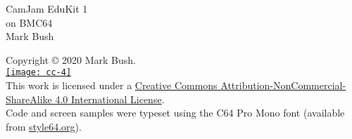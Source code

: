 \begin{titlepage}
\sffamily\bfseries
\vspace*{20ex}
\begin{flushright}\Huge
CamJam EduKit 1\\
on BMC64\\[2ex]\Large
Mark Bush
\end{flushright}
\end{titlepage}

\begin{titlepage}
\setlength{\parindent}{0pt}

\vspace*{\fill}

Copyright \copyright{} 2020 Mark Bush.\\[2ex]
\href{http://creativecommons.org/licenses/by-nc-sa/4.0/}{\texttt{[image: cc-4]}}\\
This work is licensed under a \href{http://creativecommons.org/licenses/by-nc-sa/4.0/}{Creative Commons Attribution-NonCommercial-ShareAlike 4.0 International License}.\\[2ex]

Code and screen samples were typeset using the C64 Pro Mono font (available from \href{style64.org}{style64.org}).

\end{titlepage}


